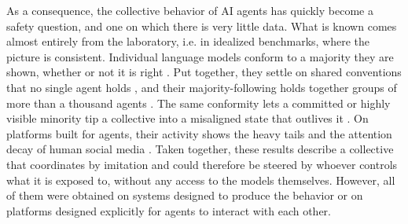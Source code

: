 \documentclass[11pt]{article}
\begin{document}
As a consequence, the collective behavior of AI agents has quickly become a safety question, and one on which there is very little data. What is known comes almost entirely from the laboratory, i.e. in idealized benchmarks, where the picture is consistent. Individual language models conform to a majority they are shown, whether or not it is right \cite{zhu2025conformity,weng2025conformity,bito2026normative,bellina2026conformity}. Put together, they settle on shared conventions that no single agent holds \cite{ashery2025emergent,perez2024cultural}, and their majority-following holds together groups of more than a thousand agents \cite{demarzo2026sciadv}. The same conformity lets a committed or highly visible minority tip a collective into a misaligned state that outlives it \cite{demarzo2026conformity,okawa2026biased,shen2026ai,willis2026collective}. On platforms built for agents, their activity shows the heavy tails and the attention decay of human social media \cite{demarzo2023scalefree,papachristou2025network,zhu2025chirper,de2026collective,fadaei2026gender}. Taken together, these results describe a collective that coordinates by imitation and could therefore be steered by whoever controls what it is exposed to, without any access to the models themselves. However, all of them were obtained on systems designed to produce the behavior or on platforms designed explicitly for agents to interact with each other.  
\end{document}
